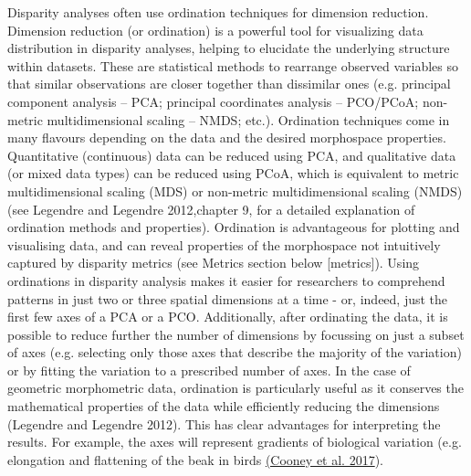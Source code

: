 Disparity analyses often use ordination techniques for dimension reduction.
Dimension reduction (or ordination) is a powerful tool for visualizing data distribution in disparity analyses, helping to elucidate the underlying structure within datasets.
These are statistical methods to rearrange observed variables so that similar observations are closer together than dissimilar ones (e.g. principal component analysis -- PCA; principal coordinates analysis -- PCO/PCoA; non-metric multidimensional scaling -- NMDS; etc.).
Ordination techniques come in many flavours depending on the data and the desired morphospace properties.
Quantitative (continuous) data can be reduced using PCA, and qualitative data (or mixed data types) can be reduced using PCoA, which is equivalent to metric multidimensional scaling (MDS) or non-metric multidimensional scaling (NMDS) (see Legendre and Legendre 2012,chapter 9, for a detailed explanation of ordination methods and properties).
Ordination is advantageous for plotting and visualising data, and can reveal properties of the morphospace not intuitively captured by disparity metrics (see Metrics section below {[}metrics{]}).
Using ordinations in disparity analysis makes it easier for researchers to comprehend patterns in just two or three spatial dimensions at a time - or, indeed, just the first few axes of a PCA or a PCO.
Additionally, after ordinating the data, it is possible to reduce further the number of dimensions by focussing on just a subset of axes (e.g. selecting only those axes that describe the majority of the variation) or by fitting the variation to a prescribed number of axes.
In the case of geometric morphometric data, ordination is particularly useful as it conserves the mathematical properties of the data while efficiently reducing the dimensions (Legendre and Legendre 2012). %
This has clear advantages for interpreting the results.
For example, the axes will represent gradients of biological variation (e.g. elongation and flattening of the beak in birds \href{https://paperpile.com/c/sTGYvp/RjqE}{(Cooney et al. 2017}).


